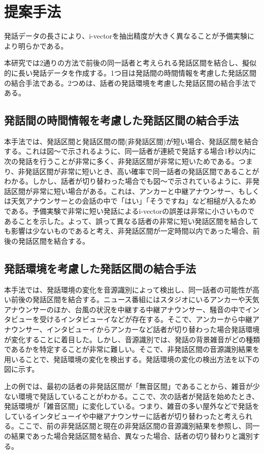 \chapter{提案手法}
発話データの長さにより、i-vectorを抽出精度が大きく異なることが予備実験により明らかである。\par
本研究では2通りの方法で前後の同一話者と考えられる発話区間を結合し、擬似的に長い発話データを作成する。1つ目は発話間の時間情報を考慮した発話区間の結合手法である。2つめは、話者の発話環境を考慮した発話区間の結合手法である。

\section{発話間の時間情報を考慮した発話区間の結合手法}
本手法では、発話区間と発話区間の間(非発話区間)が短い場合、発話区間を結合する。これは図〜で示されるように、同一話者が連続で発話する場合1秒以内に次の発話を行うことが非常に多く、非発話区間が非常に短いためである。つまり、非発話区間が非常に短いとき、高い確率で同一話者の発話区間であることがわかる。しかし、話者が切り替わった場合でも図〜で示されているように、非発話区間が非常に短い場合がある。これは、アンカーと中継アナウンサー、もしくは天気アナウンサーとの会話の中で「はい」「そうですね」など相槌が入るためである。予備実験で非常に短い発話によるi-vectorの誤差は非常に小さいものであることを示した。よって、誤って異なる話者の非常に短い発話区間を結合しても影響は少ないものであると考え、非発話区間が一定時間以内であった場合、前後の発話区間を結合する。

\section{発話環境を考慮した発話区間の結合手法}
本手法では、発話環境の変化を音源識別によって検出し、同一話者の可能性が高い前後の発話区間を結合する。ニュース番組にはスタジオにいるアンカーや天気アナウンサーのほか、台風の状況を中継する中継アナウンサー、騒音の中でインタビューを受けるインタビューイなどが存在する。そこで、アンカーから中継アナウンサー、インタビューイからアンカーなど話者が切り替わった場合発話環境が変化することに着目した。しかし、音源識別では、発話の背景雑音がどの種類であるかを特定することが非常に難しい。そこで、非発話区間の音源識別結果を用いることで、発話環境の変化を検出する。発話環境の変化の検出方法を以下の図に示す。\par



上の例では、最初の話者の非発話区間が「無音区間」であることから、雑音が少ない環境で発話していることがわかる。ここで、次の話者が発話を始めたとき、発話環境が「雑音区間」に変化している。つまり、雑音の多い屋外などで発話をしているインタビューイや中継アナウンサーに話者が切り替わったと考えられる。ここで、前の非発話区間と現在の非発話区間の音源識別結果を参照し、同一の結果であった場合発話区間を結合、異なった場合、話者の切り替わりと識別する。


